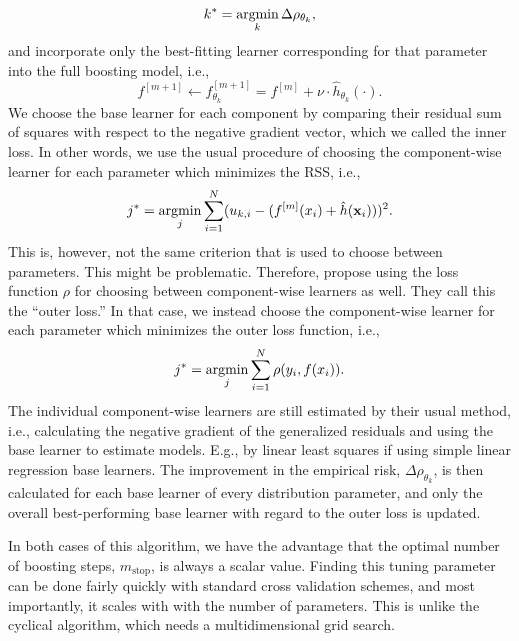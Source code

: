 \begin{equation}
    k^*=\operatorname*{argmin}_k\Delta\rho_{\theta_k},
\end{equation}
and incorporate only the best-fitting learner corresponding for that parameter into the full boosting model, i.e.,
\begin{equation}
    f^{[m+1]}\gets f^{[m+1]}_{\theta_k}=f^{[m]}+\nu\cdot\hat{h}_{\theta_k}(\cdot).
\end{equation}
We choose the base learner for each component by comparing their residual sum of squares with respect to the negative gradient vector, which we called the inner loss. In other words, we use the usual procedure of choosing the component-wise learner for each parameter which minimizes the RSS, i.e.,
\begin{equation}
    j^*=\operatorname*{argmin}_{j} \sum_{i=1}^N (u_{k,i}-(f^{[m]}(x_i)+\hat{h}(\mathbf{x}_i)))^2.
\end{equation}
This is, however, not the same criterion that is used to choose between parameters. This might be problematic. Therefore, \citet{thomas2018} propose using the loss function $\rho$ for choosing between component-wise learners as well. They call this the ``outer loss.'' In that case, we instead choose the component-wise learner for each parameter which minimizes the outer loss function, i.e., 
\begin{equation}
    j^*=\operatorname*{argmin}_{j} \sum_{i=1}^N \rho(y_i,f(x_i)).
\end{equation}
The individual component-wise learners are still estimated by their usual method, i.e., calculating the negative gradient of the generalized residuals and using the base learner to estimate models. E.g., by linear least squares if using simple linear regression base learners. The improvement in the empirical risk, $\Delta\rho_{\theta_k}$, is then calculated for each base learner of every distribution parameter, and only the overall best-performing base learner with regard to the outer loss is updated.

In both cases of this algorithm, we have the advantage that the optimal number of boosting steps, $m_{\text{stop}}$, is always a scalar value. Finding this tuning parameter can be done fairly quickly with standard cross validation schemes, and most importantly, it scales with with the number of parameters. This is unlike the cyclical algorithm, which needs a multidimensional grid search.

